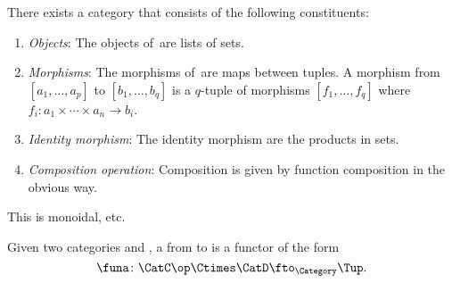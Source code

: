 \begin{definition}
    \label{def:Tup}
    There exists a category \Tup that consists of the following constituents:
    \begin{enumerate}
        \item \emph{Objects}: The objects of~\Tup are lists of sets.
        \item \emph{Morphisms}: The morphisms of~\Tup are maps between tuples.
              A morphism from $[a_1, \dots, a_p]$ to $[b_1,\dots, b_q]$ is a $q$-tuple of morphisms $[f_1, \dots, f_q]$ where $f_i: a_1 \times \cdots \times a_n \to b_i$.
        \item \emph{Identity morphism}: The identity morphism are the products in sets.
        \item \emph{Composition operation}: Composition is given by function composition in the obvious way.
    \end{enumerate}
\end{definition}
This is monoidal, etc.

\begin{ctdefinition}[T-Profunctors]
    \label{def:Tprofunctor}
    Given two categories \CatC and \CatD, a \emph{} from \CatC to \CatD is a functor of the form
    \begin{equation}
        \label{eq:Tprofunctors-def-1}
        \funa\colon \CatC\op \Ctimes \CatD \fto_{\Category} \Tup.
    \end{equation}
\end{ctdefinition}
